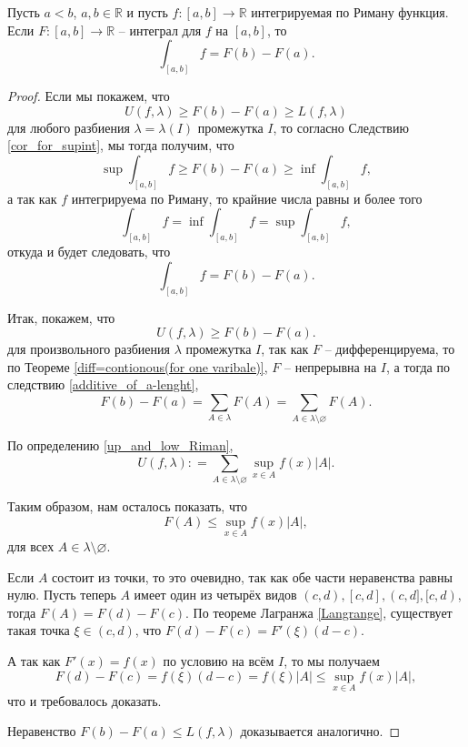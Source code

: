 \begin{theorem}
    Пусть $a<b$, $a,b \in \mathbb{R}$ и пусть $f:[a,b] \to \mathbb{R}$ интегрируемая по Риману функция. Если $F:[a,b] \to \mathbb{R}$ -- интеграл для $f$ на $[a,b]$, то
    \[
     \int_{[a,b]}f = F(b) - F(a).
    \]
\end{theorem}
\begin{proof}
Если мы покажем, что
    \[
     U(f,\lambda) \ge F(b) -F(a) \ge L(f,\lambda)
    \]
для любого разбиения $\lambda = \lambda(I)$ промежутка $I$, то согласно Следствию \ref{cor_for_supint}, мы тогда получим, что
\[
 \sup \int_{[a,b]}f \ge F(b) - F(a) \ge \inf \int_{[a,b]}f,
\]
а так как $f$ интегрируема по Риману, то крайние числа равны и более того
\[
 \int_{[a,b]} f = \inf  \int_{[a,b]} f = \sup  \int_{[a,b]} f,
\]
откуда и будет следовать, что
\[
  \int_{[a,b]} f = F(b) - F(a).
\]

Итак, покажем, что 
\[
 U(f,\lambda) \ge F(b) - F(a).
\]
для произвольного разбиения $\lambda$ промежутка $I$, так как $F$ -- дифференцируема, то по Теореме \ref{diff=contionous(for one varibale)}, $F$ -- непрерывна на $I$, а тогда по следствию \ref{additive_of_a-lenght}, 
\[
 F(b) - F(a) = \sum_{A \in \lambda} F(A) = \sum_{A \in \lambda\setminus\varnothing}F(A).
\]

По определению \ref{up_and_low_Riman},
\[
 U(f,\lambda) : = \sum_{A \in \lambda\setminus \varnothing} \sup_{x \in A}f(x)|A|.
\]

Таким образом, нам осталось показать, что
\[
 F(A) \le \sup_{x \in A} f(x) |A|, 
\]
для всех $A \in \lambda \setminus \varnothing.$ 

Если $A$ состоит из точки, то это очевидно, так как обе части неравенства равны нулю. Пусть теперь $A$ имеет один из четырёх видов $(c,d), [c,d], (c,d], [c,d)$, тогда $F(A) = F(d) - F(c)$. По теореме Лагранжа \ref{Langrange}, существует такая точка $\xi \in (c,d)$, что $F(d) - F(c) = F'(\xi)(d-c)$.

А так как $F'(x) = f(x)$ по условию на всём $I$, то мы получаем
\[
 F(d) - F(c) = f(\xi) (d-c) = f(\xi)|A| \le \sup_{x \in A}f(x)|A|,
 \]
что и требовалось доказать. 

Неравенство $F(b) - F(a) \le L(f,\lambda)$ доказывается аналогично.
\end{proof}


